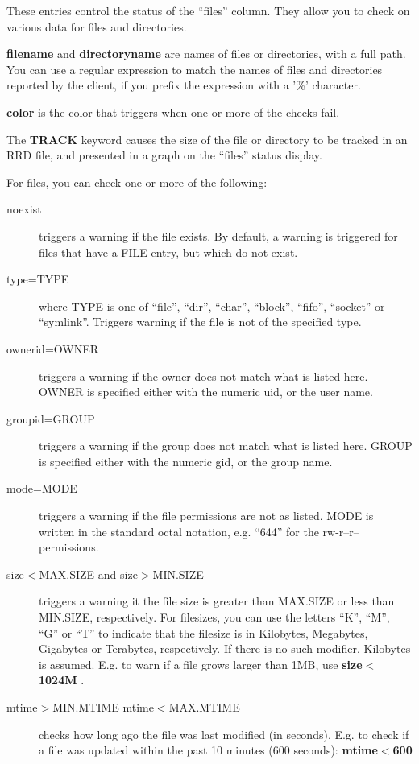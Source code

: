   These entries control the status of the ``files'' column. They allow you to check on various data for files and directories. 


 \textbf{filename}
 and \textbf{directoryname}
 are names of files or directories, with a full path. You can use a regular expression to match the names of files and directories reported by the client, if you prefix the expression with a '\%' character. 


 \textbf{color}
 is the color that triggers when one or more of the checks fail. 


  The \textbf{TRACK}
 keyword causes the size of the file or directory to be tracked in an RRD file, and presented in a graph on the ``files'' status display. 


  For files, you can check one or more of the following: \begin{description}
\item[noexist] triggers a warning if the file exists. By default, a warning is triggered for files that have a FILE entry, but which do not exist. 
\item[type=TYPE] where TYPE is one of ``file'', ``dir'', ``char'', ``block'', ``fifo'', ``socket'' or ``symlink''. Triggers warning if the file is not of the specified type. 
\item[ownerid=OWNER] triggers a warning if the owner does not match what is listed here. OWNER is specified either with the numeric uid, or the user name. 
\item[groupid=GROUP] triggers a warning if the group does not match what is listed here. GROUP is specified either with the numeric gid, or the group name. 
\item[mode=MODE] triggers a warning if the file permissions are not as listed. MODE is written in the standard octal notation, e.g. ``644'' for the rw-r--r-- permissions. 
\item[size$<$MAX.SIZE and size$>$MIN.SIZE] triggers a warning it the file size is greater than MAX.SIZE or less than MIN.SIZE, respectively. For filesizes, you can use the letters ``K'', ``M'', ``G'' or ``T'' to indicate that the filesize is in Kilobytes, Megabytes, Gigabytes or Terabytes, respectively. If there is no such modifier, Kilobytes is assumed. E.g. to warn if a file grows larger than 1MB, use \textbf{size$<$1024M}
. 
\item[mtime$>$MIN.MTIME mtime$<$MAX.MTIME] checks how long ago the file was last modified (in seconds). E.g. to check if a file was updated within the past 10 minutes (600 seconds): \textbf{mtime$<$600}

\end{description}
